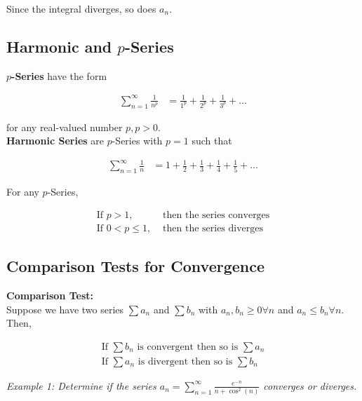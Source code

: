         \noindent Since the integral diverges, so does $a_n$.


    \subsection{Harmonic and $p$-Series}
        \color{purple} \textbf{$p$-Series} \color{black} have the form

        \begin{align*}
            \sum^\infty_{n=1} \frac{1}{n^p} &= \frac{1}{1^p}+\frac{1}{2^p}+\frac{1}{3^p}+\dots
        \end{align*}

        \noindent for any real-valued number $p, p>0$. \\

        \noindent \color{purple} \textbf{Harmonic Series} \color{black} are $p$-Series with $p=1$
        such that

        \begin{align}
            \sum^\infty_{n=1} \frac{1}{n} &= 1+\frac{1}{2}+\frac{1}{3}+\frac{1}{4}+\frac{1}{5}+\dots
        \end{align}

        \noindent For any $p$-Series,

        \begin{align*}
            \text{If } p>1, & \text{ then the series converges} \\
            \text{If } 0<p\leq 1, & \text{ then the series diverges}
        \end{align*}


    \subsection{Comparison Tests for Convergence}
        \color{purple} \textbf{Comparison Test:} \color{black} \\
        \noindent Suppose we have two series $\sum a_n$ and $\sum b_n$ with $a_n,b_n\geq 0\forall n$
        and $a_n\leq b_n\forall n$. Then,

        \begin{align*}
            \text{If }\sum b_n \text{ is convergent then so is } \sum a_n \\
            \text{If }\sum a_n \text{ is divergent then so is } \sum b_n
        \end{align*}

        \noindent \color{blue} \textit{Example 1: Determine if the series $a_n=\sum^\infty_{n=1}
        \frac{e^{-n}}{n+\cos^2{(n)}}$ converges or diverges.} \color{black}


